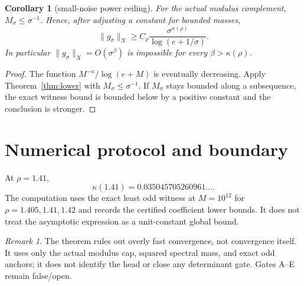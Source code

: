 \documentclass[11pt]{article}
\newtheorem{corollary}[theorem]{Corollary}
\theoremstyle{remark}\newtheorem{remark}[theorem]{Remark}
\begin{document}
\begin{corollary}[small-noise power ceiling]\label{cor:noise}
For the actual modulus complement, $M_\sigma\le\sigma^{-1}$.  Hence, after
adjusting a constant for bounded masses,
\[
 \|g_\sigma\|_X\ge
 C_\rho\frac{\sigma^{\kappa(\rho)}}
 {\log(e+1/\sigma)}.
\]
In particular $\|g_\sigma\|_X=O(\sigma^\beta)$ is impossible for every
$\beta>\kappa(\rho)$.
\end{corollary}
\begin{proof}
The function $M^{-\kappa}/\log(e+M)$ is eventually decreasing.  Apply
Theorem~\ref{thm:lower} with $M_\sigma\le\sigma^{-1}$.  If $M_\sigma$ stays
bounded along a subsequence, the exact witness bound is bounded below by a
positive constant and the conclusion is stronger.
\end{proof}

\section{Numerical protocol and boundary}
At $\rho=1.41$,
\[
 \kappa(1.41)=0.035045705260961\ldots.
\]
The computation uses the exact least odd witness at $M=10^{12}$ for
$\rho=1.405,1.41,1.42$ and records the certified coefficient lower bounds.
It does not treat the asymptotic expression as a unit-constant global bound.

\begin{remark}
The theorem rules out overly fast convergence, not convergence itself.  It
uses only the actual modulus cap, squared spectral mass, and exact odd
anchors; it does not identify the head or close any determinant gate.
Gates A--E remain false/open.
\end{remark}
\end{document}
